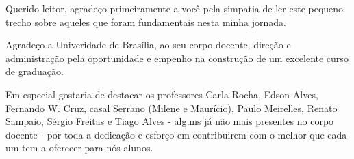 \begin{agradecimentos}
    Querido leitor, agradeço primeiramente a você pela simpatia de
    ler este pequeno trecho sobre aqueles que foram fundamentais
    nesta minha jornada.

    Agradeço a Univeridade de Brasília, ao seu corpo docente, direção
    e administração pela oportunidade e empenho na construção de um
    excelente curso de graduação.

    Em especial gostaria de destacar os professores Carla Rocha, Edson
    Alves, Fernando W. Cruz, casal Serrano (Milene e Maurício), Paulo
    Meirelles, Renato Sampaio, Sérgio Freitas e Tiago Alves - alguns já
    não mais presentes no corpo docente - por toda a dedicação e esforço
    em contribuirem com o melhor que cada um tem a oferecer para nós alunos.
\end{agradecimentos}
